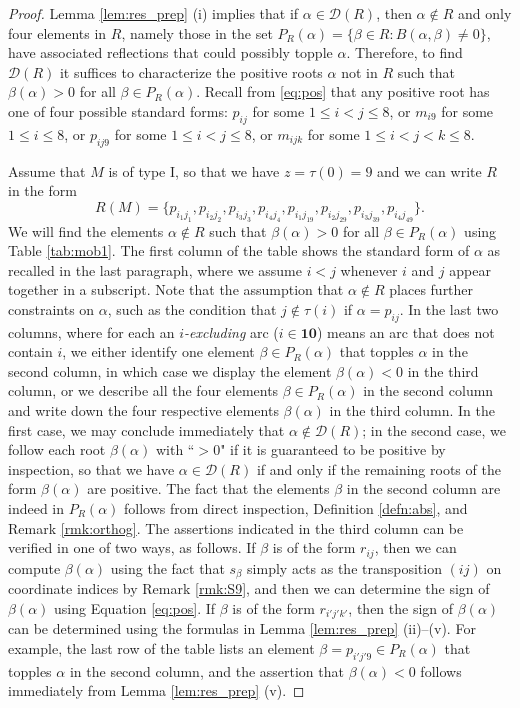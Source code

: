 \documentclass[11pt]{amsart}
\theoremstyle{plain}
\theoremstyle{definition}
\theoremstyle{remark}
\numberwithin{equation}{section}
\newcommand{\al}{\alpha}
\newcommand{\be}{\beta}
\newcommand{\res}{\mathscr{D}}
\newcommand{\ten}{\mathbf{10}}
\newcommand{\pra}{P_R(\al)}
\begin{document}
\begin{proof}
  Lemma \ref{lem:res_prep} (i) implies that if
  $\al\in \res(R)$, then $\al\notin R$ and only four elements in $R$,
  namely those in the set $\pra=\{\be\in R: B(\al,\be)\neq0\}$, have associated
  reflections that could possibly topple $\al$. Therefore, to
  find $\res(R)$ it suffices to characterize the positive roots $\al$ not in $R$
  such that $\beta(\al)>0$ for all $\be\in \pra$. Recall from \eqref{eq:pos}
  that any positive root has one of four possible standard forms: $p_{ij}$ for some
  $1\le i<j\le 8$, or $m_{i9}$ for some $1\le i \le 8$, or $p_{ij9}$ for some
  $1\le i<j\le 8$, or $m_{ijk}$ for some $1\le i<j<k\le 8$.


  Assume that $M$ is of type I, so that we have $z=\tau(0)=9$ and we can write
  $R$ in the form \[ R(M)=\{p_{i_1j_1}, p_{i_2j_2}, p_{i_3j_3}, p_{i_4j_4},
  p_{i_1j_19}, p_{i_2j_29}, p_{i_3j_39}, p_{i_4j_49}\}. \] We will find the
  elements $\al\notin R$ such that $\be(\al)>0$ for all $\be\in \pra$ using
  Table \ref{tab:mob1}. The first column of the table shows the standard form of
  $\al$ as recalled in the last paragraph, where we assume $i<j$ whenever $i$
  and $j$ appear together in a subscript. Note that the assumption that
  $\al\notin R$ places further constraints on $\al$, such as the condition that
  $j\notin \tau(i)$ if $\al=p_{ij}$.
  In the last two columns, where for each an
  \emph{$i$-excluding} arc ($i\in \ten$) means an arc that does not contain $i$,
  we either identify one element $\be\in \pra$ that topples $\al$ in the second
  column, in which case we display the element $\be(\al)<0$ in the third column,
  or we describe all the four elements $\be\in\pra$ in the second column and
  write down the four respective elements $\be(\al)$ in the third column.   In
  the first case, we may conclude immediately that $\al\notin \res(R)$; in the
  second case, we follow each root $\be(\al)$ with ``$>0$" if it is guaranteed
  to be positive by inspection, so that we have $\al\in \res(R)$ if and only if
  the remaining roots of the form $\be(\al)$ are positive. The fact that the
  elements $\be$ in the second column are indeed in $\pra$ follows from direct
  inspection, Definition \ref{defn:abs}, and Remark \ref{rmk:orthog}.
  The assertions indicated in the third column can be verified in one of two
  ways, as follows. If $\be$ is of the form $r_{ij}$, then we can compute
  $\be(\al)$ using the fact that $s_\be$ simply acts as the transposition $(ij)$
  on coordinate indices by Remark \ref{rmk:S9}, and then we can determine the
  sign of $\be(\al)$ using Equation \eqref{eq:pos}. If $\be$ is of the form
  $r_{i'j'k'}$, then the sign of $\be(\al)$ can be determined using the formulas
  in Lemma \ref{lem:res_prep} (ii)--(v). For example, the last row of the table
  lists an element $\be=p_{i'j'9}\in\pra $ that topples $\al$ in the second
  column, and the assertion that $\be(\al)<0$ follows immediately from Lemma
  \ref{lem:res_prep} (v).
  


\end{proof}
\end{document}
